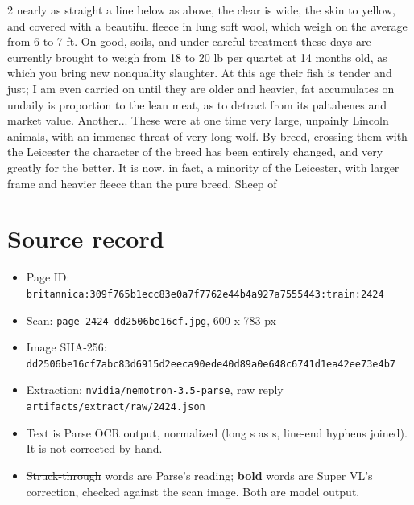 \documentclass[10pt]{article}
\begin{document}
\begin{multicols}{2}
nearly as straight a line below as above, the clear is wide, the skin to yellow, and covered with a beautiful fleece in lung soft wool, which weigh on the average from 6 to 7 ft. On good, soils, and under careful treatment these days are currently brought to weigh from 18 to 20 lb per quartet at 14 months old, as which you bring new nonquality slaughter. At this age their fish is tender and just; I am even carried on until they are older and heavier, fat accumulates on undaily is proportion to the lean meat, as to detract from its paltabenes and market value. Another... These were at one time very large, unpainly Lincoln animals, with an immense threat of very long wolf. By breed, crossing them with the Leicester the character of the breed has been entirely changed, and very greatly for the better. It is now, in fact, a minority of the Leicester, with larger frame and heavier fleece than the pure breed. Sheep of
\end{multicols}
\section*{Source record}
\begin{itemize}
\item Page ID: \texttt{britannica:309f765b1ecc83e0a7f7762e44b4a927a7555443:train:2424}
\item Scan: \texttt{page-2424-dd2506be16cf.jpg}, 600 x 783 px
\item Image SHA-256: \texttt{\small dd2506be16cf7abc83d6915d2eeca90ede40d89a0e648c6741d1ea42ee73e4b7}
\item Extraction: \texttt{nvidia/nemotron-3.5-parse}, raw reply \texttt{artifacts/extract/raw/2424.json}
\item Text is Parse OCR output, normalized (long s as s, line-end hyphens joined). It is not corrected by hand.
\item \sout{Struck-through} words are Parse's reading; \textbf{bold} words are Super VL's correction, checked against the scan image. Both are model output.
\end{itemize}
\end{document}
